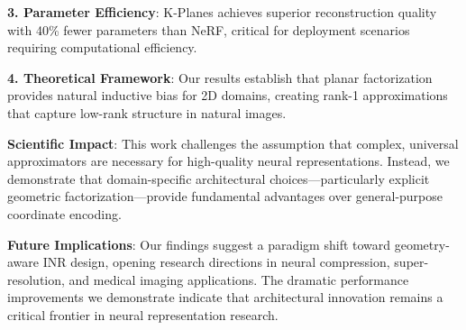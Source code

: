 \documentclass[10pt,twocolumn,letterpaper]{article}
\begin{document}
\textbf{3. Parameter Efficiency}: K-Planes achieves superior reconstruction quality with 40\% fewer parameters than NeRF, critical for deployment scenarios requiring computational efficiency.

\textbf{4. Theoretical Framework}: Our results establish that planar factorization provides natural inductive bias for 2D domains, creating rank-1 approximations that capture low-rank structure in natural images.

\textbf{Scientific Impact}: This work challenges the assumption that complex, universal approximators are necessary for high-quality neural representations. Instead, we demonstrate that domain-specific architectural choices—particularly explicit geometric factorization—provide fundamental advantages over general-purpose coordinate encoding.

\textbf{Future Implications}: Our findings suggest a paradigm shift toward geometry-aware INR design, opening research directions in neural compression, super-resolution, and medical imaging applications. The dramatic performance improvements we demonstrate indicate that architectural innovation remains a critical frontier in neural representation research.

\small


\end{document}
